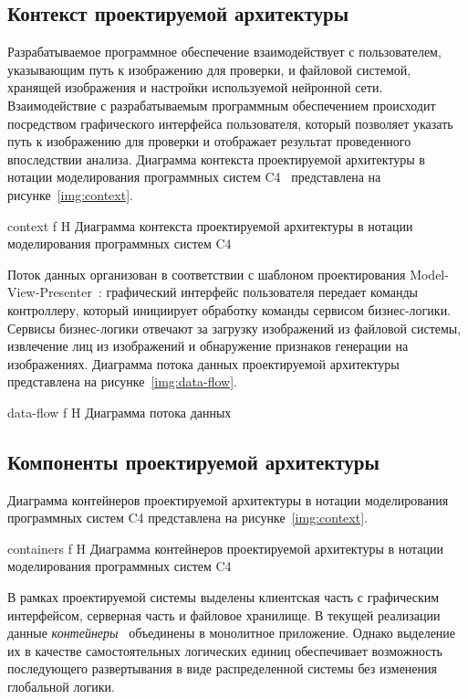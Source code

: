 \newpage

\subsection{Контекст проектируемой архитектуры}

Разрабатываемое программное обеспечение взаимодействует с пользователем, указывающим путь к изображению для проверки, и файловой системой, хранящей изображения и настройки используемой нейронной сети. Взаимодействие с разрабатываемым программным обеспечением происходит посредством графического интерфейса пользователя, который позволяет указать путь к изображению для проверки и отображает результат проведенного впоследствии анализа. Диаграмма контекста проектируемой архитектуры в нотации моделирования программных систем C4~\cite{c4} представлена на рисунке~\ref{img:context}.

{context}
{f} %
{H}
{\textwidth} %
{Диаграмма контекста проектируемой архитектуры в нотации моделирования программных систем C4}

Поток данных организован в соответствии с шаблоном проектирования Model-View-Presenter~\cite{patterns}: графический интерфейс пользователя передает команды контроллеру, который инициирует обработку команды сервисом бизнес-логики. Сервисы бизнес-логики отвечают за загрузку изображений из файловой системы, извлечение лиц из изображений и обнаружение признаков генерации на изображениях. Диаграмма потока данных проектируемой архитектуры представлена на рисунке~\ref{img:data-flow}.

{data-flow}
{f} %
{H}
{\textwidth} %
{Диаграмма потока данных}

\newpage

\subsection{Компоненты проектируемой архитектуры}

Диаграмма контейнеров проектируемой архитектуры в нотации моделирования программных систем C4 представлена на рисунке~\ref{img:context}.

{containers}
{f} %
{H}
{\textwidth} %
{Диаграмма контейнеров проектируемой архитектуры в нотации моделирования программных систем C4}

В рамках проектируемой системы выделены клиентская часть с графическим интерфейсом, серверная часть и файловое хранилище. В текущей реализации данные \textit{контейнеры}~\cite{c4} объединены в монолитное приложение. Однако выделение их в качестве самостоятельных логических единиц обеспечивает возможность последующего развертывания в виде распределенной системы без изменения глобальной логики.


